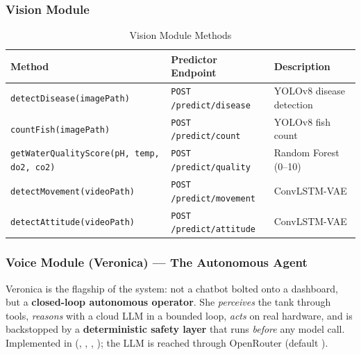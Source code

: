 \documentclass[12pt,a4paper,oneside]{article}
\begin{document}
\subsubsection{Vision Module}
\begin{table}[H]
    \centering
    \begin{tabularx}{\textwidth}{YXY}
        \toprule
        \textbf{Method} & \textbf{Predictor Endpoint} & \textbf{Description} \\
        \midrule
        \texttt{detectDisease(imagePath)} & \texttt{POST /predict/disease} & YOLOv8 disease detection \\
        \texttt{countFish(imagePath)} & \texttt{POST /predict/count} & YOLOv8 fish count \\
        \texttt{getWaterQualityScore(pH, temp, do2, co2)} & \texttt{POST /predict/quality} & Random Forest (0--10) \\
        \texttt{detectMovement(videoPath)} & \texttt{POST /predict/movement} & ConvLSTM-VAE \\
        \texttt{detectAttitude(videoPath)} & \texttt{POST /predict/attitude} & ConvLSTM-VAE \\
        \bottomrule
    \end{tabularx}
    \caption{Vision Module Methods}
\end{table}

\subsubsection{Voice Module (Veronica) --- The Autonomous Agent}
\label{sec:veronica}
\RaggedRight
Veronica is the flagship of the system: not a chatbot bolted onto a dashboard, but a
\textbf{closed-loop autonomous operator}. She \emph{perceives} the tank through tools,
\emph{reasons} with a cloud LLM in a bounded loop, \emph{acts} on real hardware, and is
backstopped by a \textbf{deterministic safety layer} that runs \emph{before} any model call.
Implemented in 
(, ,
, );
the LLM is reached through OpenRouter
(default ).
\justifying
\end{document}
